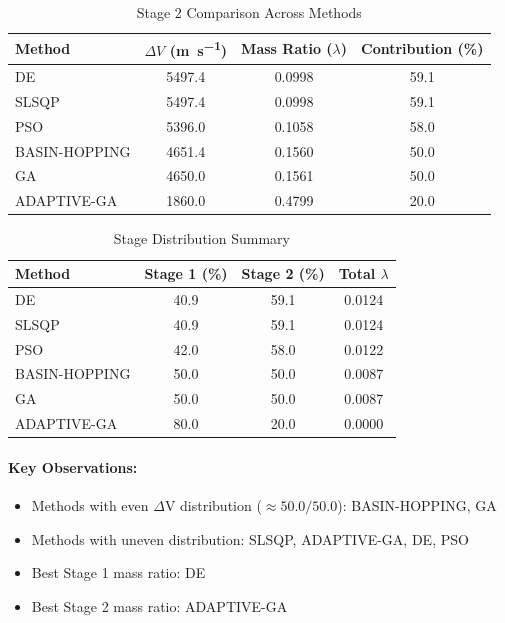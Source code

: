 \documentclass{article}
\begin{document}
\begin{table}[H]
\centering
\caption{Stage 2 Comparison Across Methods}
\begin{tabular}{lS[table-format=4.1]S[table-format=1.4]S[table-format=3.1]}
\toprule
Method & {$\Delta V$ (\si{\meter\per\second})} & {Mass Ratio ($\lambda$)} & {Contribution (\%)} \\
\midrule
DE           & 5497.4 & 0.0998 & 59.1 \\
SLSQP        & 5497.4 & 0.0998 & 59.1 \\
PSO          & 5396.0 & 0.1058 & 58.0 \\
BASIN-HOPPING & 4651.4 & 0.1560 & 50.0 \\
GA           & 4650.0 & 0.1561 & 50.0 \\
ADAPTIVE-GA  & 1860.0 & 0.4799 & 20.0 \\
\bottomrule
\end{tabular}
\end{table}

\begin{table}[H]
\centering
\caption{Stage Distribution Summary}
\begin{tabular}{lS[table-format=4.1]S[table-format=4.1]S[table-format=1.4]}
\toprule
Method & {Stage 1 (\%)} & {Stage 2 (\%)} & {Total $\lambda$} \\
\midrule
DE           & 40.9 & 59.1 & 0.0124 \\
SLSQP        & 40.9 & 59.1 & 0.0124 \\
PSO          & 42.0 & 58.0 & 0.0122 \\
BASIN-HOPPING & 50.0 & 50.0 & 0.0087 \\
GA           & 50.0 & 50.0 & 0.0087 \\
ADAPTIVE-GA  & 80.0 & 20.0 & 0.0000 \\
\bottomrule
\end{tabular}
\end{table}

\paragraph{Key Observations:}
\begin{itemize}
\item Methods with even $\Delta$V distribution ($\approx50.0/50.0$): BASIN-HOPPING, GA
\item Methods with uneven distribution: SLSQP, ADAPTIVE-GA, DE, PSO
\item Best Stage 1 mass ratio: DE
\item Best Stage 2 mass ratio: ADAPTIVE-GA
\end{itemize}
\end{document}
